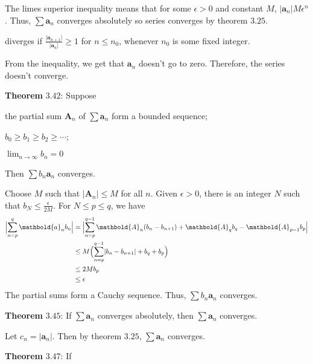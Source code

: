 \begin{exercise}
\begin{exercise}[label = (\alph*)]
    \par\smallskip
    The limes superior inequality means that for some \(\epsilon > 0\) and
    constant \(M\), \(\lvert\mathbold{a}_n\rvert M\epsilon ^n\).
    Thus, \(\sum\mathbold{a}_n\) converges absolutely so series converges by
    theorem \(3.25\).
  \item
    diverges if \(\frac{\lvert\mathbold{a}_{n + 1}\rvert}
    {\lvert\mathbold{a}_n\rvert}\geq 1\) for \(n\leq n_0\), whenever \(n_0\) is
    some fixed integer.
    \par\smallskip
    From the inequality, we get that \(\mathbold{a}_n\) doesn't go to zero.
    Therefore, the series doesn't converge.
  \end{exercise}
  \textbf{Theorem} \(\mathbold{3.42}\): Suppose
  \begin{exercise}[label = (\alph*)]
  \item
    the partial sum \(\mathbold{A}_n\) of \(\sum\mathbold{a}_n\) form a bounded
    sequence;
  \item
    \(b_0\geq b_1\geq b_2\geq\cdots\);
  \item
    \(\lim_{n\to\infty}b_n = 0\)
  \end{exercise}
  Then \(\sum b_n\mathbold{a}_n\) converges.
  \par\smallskip
  Choose \(M\) such that \(\lvert\mathbold{A}_n\rvert\leq M\) for all \(n\).
  Given \(\epsilon > 0\), there is an integer \(N\) such that
  \(b_N\leq\frac{\epsilon}{2M}\).
  For \(N\leq p\leq q\), we have
  \begin{align*}
    \Bigl\lvert\sum_{n = p}^q\mathbold{a}_nb_n\Bigr\rvert
    & = \Bigl\lvert\sum_{n = p}^{q - 1}\mathbold{A}_n(b_n - b_{n + 1}) +
      \mathbold{A}_qb_q - \mathbold{A}_{p - 1}b_p\Bigr\rvert\\
    & \leq M\Bigl(\sum_{n = p}^{q - 1}\lvert b_n - b_{n + 1}\rvert + b_q +
      b_p\Bigr)\\
    & \leq 2Mb_p\\
    & \leq \epsilon
  \end{align*}
  The partial sums form a Cauchy sequence.
  Thus, \(\sum b_n\mathbold{a}_n\) converges.
  \par\smallskip
  \textbf{Theorem} \(\mathbold{3.45}\): If \(\sum\mathbold{a}_n\) converges
  absolutely, then \(\sum\mathbold{a}_n\) converges.
  \par\smallskip
  Let \(c_n = \lvert\mathbold{a}_n\rvert\).
  Then by theorem \(3.25\), \(\sum\mathbold{a}_n\) converges.
  \par\smallskip
  \textbf{Theorem} \(\mathbold{3.47}\): If

\end{exercise}
